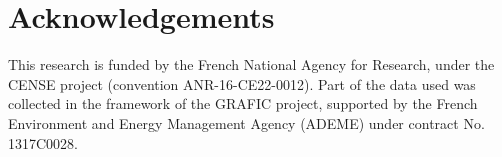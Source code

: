 \documentclass[twocolumn]{article}
\begin{document}
\section*{Acknowledgements}
\label{sec:ack}

This research is funded by the French National Agency for Research, under the CENSE project (convention ANR-16-CE22-0012). Part of the data used was collected in the framework of the GRAFIC project, supported by the French Environment and Energy Management Agency (ADEME) under contract No. 1317C0028.




\end{document}
